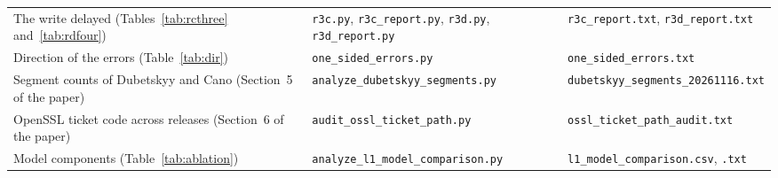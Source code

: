 \documentclass[9pt]{article}
\begin{document}
\begin{table}[h]
\begin{tabular}{@{}p{}p{}p{}@{}}
The write delayed (Tables~\ref{tab:rcthree} and~\ref{tab:rdfour}) & \texttt{r3c.py}, \texttt{r3c\_report.py}, \texttt{r3d.py}, \texttt{r3d\_report.py} & \texttt{r3c\_report.txt}, \texttt{r3d\_report.txt}\\
Direction of the errors (Table~\ref{tab:dir}) & \texttt{one\_\allowbreak sided\_\allowbreak errors.py} & \texttt{one\_\allowbreak sided\_\allowbreak errors.txt}\\
Segment counts of Dubetskyy and Cano (Section~5 of the paper) & \texttt{analyze\_\allowbreak dubetskyy\_\allowbreak segments.py} & \texttt{dubetskyy\_\allowbreak segments\_\allowbreak 20261116.txt}\\
OpenSSL ticket code across releases (Section~6 of the paper) & \texttt{audit\_\allowbreak ossl\_\allowbreak ticket\_\allowbreak path.py} & \texttt{ossl\_\allowbreak ticket\_\allowbreak path\_\allowbreak audit.txt}\\
Model components (Table~\ref{tab:ablation}) & \texttt{analyze\_l1\_model\_comparison.py} & \texttt{l1\_model\_comparison.csv}, \texttt{.txt}\\
\bottomrule
\end{tabular}
\end{table}
\end{document}
